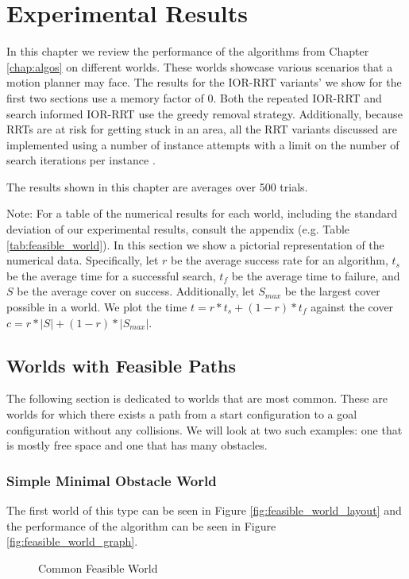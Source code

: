 \chapter{Experimental Results}
In this chapter we review the performance of the algorithms from Chapter \ref{chap:algos} on different worlds. These worlds showcase various scenarios that a motion planner may face. The results for the IOR-RRT variants' we show for the first two sections use a memory factor of 0. Both the repeated IOR-RRT and search informed IOR-RRT use the greedy removal strategy. Additionally, because RRTs are at risk for getting stuck in an area, all the RRT variants discussed are implemented using a number of instance attempts with a limit on the number of search iterations per instance \cite{wedge:heavytail}.

The results shown in this chapter are averages over 500 trials.

Note: For a table of the numerical results for each world, including the standard deviation of our experimental results, consult the appendix (e.g. Table \ref{tab:feasible_world}). In this section we show a pictorial representation of the numerical data. Specifically, let $r$ be the average success rate for an algorithm, $t_s$ be the average time for a successful search, $t_f$ be the average time to failure, and $S$ be the average cover on success. Additionally, let $S_{max}$ be the largest cover possible in a world. We plot the time $t = r * t_s + (1-r) * t_f$ against the cover $c = r * |S| + (1-r) * |S_{max}|$.

\section{Worlds with Feasible Paths}\label{results:feasible}
The following section is dedicated to worlds that are most common. These are worlds for which there exists a path from a start configuration to a goal configuration without any collisions. We will look at two such examples: one that is mostly free space and one that has many obstacles.

\subsection{Simple Minimal Obstacle World}
The first world of this type can be seen in Figure \ref{fig:feasible_world_layout} and the performance of the algorithm can be seen in Figure \ref{fig:feasible_world_graph}. 

\begin{figure}[!h]
    \hfill
    \caption{Common Feasible World}
    \label{fig:feasible_world}
\end{figure}

